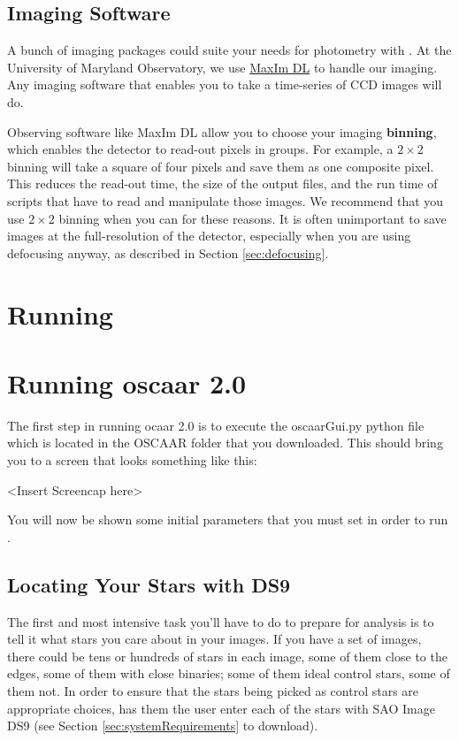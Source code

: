 \documentclass{article}
\begin{document}
\subsection{Imaging Software}
A bunch of imaging packages could suite your needs for photometry with \oscaar. At the University of Maryland Observatory, we use \href{http://www.cyanogen.com/maxim_main.php}{MaxIm DL} to handle our imaging. Any imaging software that enables you to take a time-series of CCD images will do. 

Observing software like MaxIm DL allow you to choose your imaging \textbf{binning}, which enables the detector to read-out pixels in groups. For example, a $2\times2$ binning will take a square of four pixels and save them as one composite pixel. This reduces the read-out time, the size of the output files, and the run time of scripts that have to read and manipulate those images. We recommend that you use $2\times2$ binning when you can for these reasons. It is often unimportant to save images at the full-resolution of the detector, especially when you are using defocusing anyway, as described in Section \ref{sec:defocusing}. 

\section{Running \oscaar} \label{sec:run}

\section{Running oscaar 2.0}

The first step in running ocaar 2.0 is to execute the oscaarGui.py python file which is located in the OSCAAR folder that you downloaded. This should bring you to a screen that looks something like this:

<Insert Screencap here>

You will now be shown some initial parameters that you must set in order to run \oscaar.


\subsection{Locating Your Stars with DS9}

The first and most intensive task you'll have to do to prepare \oscaar  for analysis is to tell it what stars you care about in your images. If you have a set of images, there could be tens or hundreds of stars in each image, some of them close to the edges, some of them with close binaries; some of them ideal control stars, some of them not. In order to ensure that the stars being picked as control stars are appropriate choices, \oscaar has them the user enter each of the stars with SAO Image DS9 (see Section \ref{sec:systemRequirements} to download). 
\end{document}
